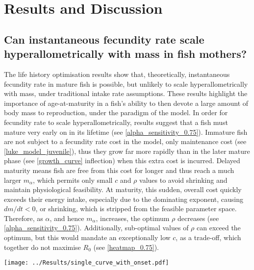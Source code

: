 \documentclass[a4paper]{article} %
\begin{document}
\section{Results and Discussion}\thispagestyle{plain}
\subsection{Can instantaneous fecundity rate scale hyperallometrically with mass in fish mothers?}
The life history optimisation results show that, theoretically, instantaneous fecundity rate in mature fish is possible, but unlikely to scale hyperallometrically with mass, under traditional intake rate assumptions. These results highlight the importance of age-at-maturity in a fish's ability to then devote a large amount of body mass to reproduction, under the paradigm of the model. In order for fecundity rate to scale hyperallometrically, results suggest that a fish must mature very early on in its lifetime (see \cref{alpha_sensitivity_0.75}). Immature fish are not subject to a fecundity rate cost in the model, only maintenance cost (see \cref{luke_model_juvenile}), thus they grow far more rapidly than in the later mature phase (see \cref{growth_curve} inflection) when this extra cost is incurred. Delayed maturity means fish are free from this cost for longer and thus reach a much larger $m_{\alpha}$, which permits only small $c$ and $\rho$ values to avoid shrinking and maintain physiological feasibility. At maturity, this sudden, overall cost quickly exceeds their energy intake, especially due to the dominating exponent, causing $dm/dt < 0$, or shrinking, which is stripped from the feasible parameter space. Therefore, as $\alpha$, and hence $m_{\alpha}$, increases, the optimum $\rho$ decreases (see \cref{alpha_sensitivity_0.75}). Additionally, sub-optimal values of $\rho$ can exceed the optimum, but this would mandate an exceptionally low $c$, as a trade-off, which together do not maximise $R_0$ (see \cref{heatmap_0.75}).

\begin{center}
    \begin{minipage}{0.8\linewidth}
        \texttt{[image: ../Results/single\_curve\_with\_onset.pdf]}
        \label{growth_curve}
    \end{minipage}\\
\end{center}
\end{document}
